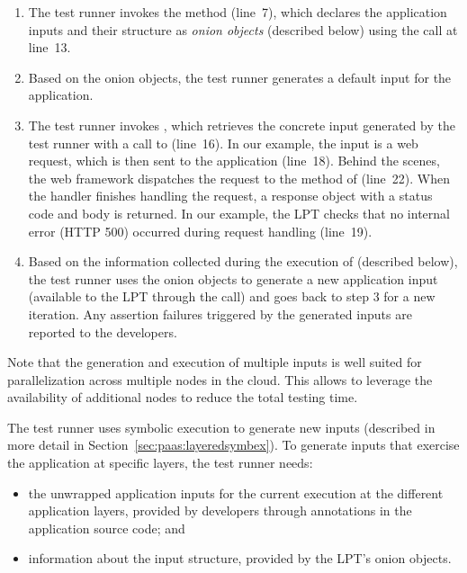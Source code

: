 \begin{enumerate}
\item The test runner invokes the  method (line~7),
  which declares the application inputs and their structure as
  \emph{onion objects} (described below) using the
   call at line~13.
\item Based on the onion objects, the test runner generates a default
  input for the application.
\item The test runner invokes , which retrieves the
  concrete input generated by the test runner with a call to
   (line~16).  In our example, the input is a web
  request, which is then sent to the application (line~18).  Behind
  the scenes, the web framework dispatches the request to the
   method of  (line~22).  When
  the handler finishes handling the request, a response object with a
  status code and body is returned.  In our example, the LPT checks
  that no internal error (HTTP 500) occurred during request handling
  (line~19).
\item Based on the information collected during the execution of
   (described below), the test runner uses the onion
  objects to generate a new application input (available to the LPT
  through the  call) and goes back to step 3 for a
  new iteration.  
%
  Any assertion failures triggered by the generated inputs are
  reported to the developers.
\end{enumerate}
%
Note that the generation and execution of multiple inputs is well
suited for parallelization across multiple nodes in the cloud. This
allows to leverage the availability of additional nodes to reduce the
total testing time.

The test runner uses symbolic execution to generate new inputs (described in more detail in Section~\ref{sec:paas:layeredsymbex}). To generate inputs that exercise the application at specific layers, the test runner needs:
\begin{itemize}
\item the unwrapped application inputs for the current execution at the different application layers, provided by developers through annotations in the application source code; and
\item information about the input structure, provided by the LPT's onion objects.
\end{itemize}

